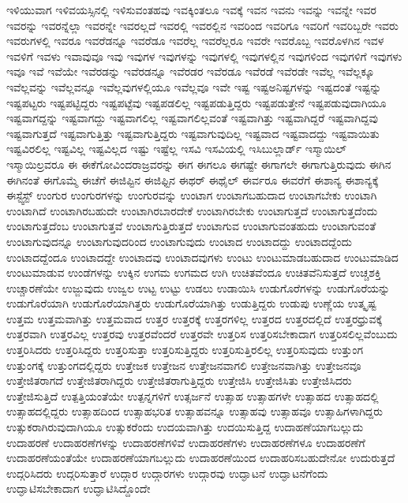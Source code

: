 {ಇಳಿಯುವಾಗ
ಇಳಿವಯಸ್ಸಿನಲ್ಲಿ
ಇಳಿಸುವಂತಹವು
ಇವಕ್ಕಿಂತಲೂ
ಇವಕ್ಕೆ
ಇವನ
ಇವನು
ಇವನ್ನು
ಇವನ್ನೇ
ಇವರ
ಇವರನ್ನು
ಇವರನ್ನೆಲ್ಲಾ
ಇವರನ್ನೇ
ಇವರಲ್ಲದೆ
ಇವರಲ್ಲಿ
ಇವರಲ್ಲಿನ
ಇವರಿಂದ
ಇವರಿಗೂ
ಇವರಿಗೆ
ಇವರಿಬ್ಬರೇ
ಇವರು
ಇವರುಗಳಲ್ಲಿ
ಇವರೂ
ಇವರೆಡನ್ನೂ
ಇವರೆಡೂ
ಇವರೆಲ್ಲ
ಇವರೆಲ್ಲರೂ
ಇವರೇ
ಇವರೊಬ್ಬ
ಇವರೊಳಗಿನ
ಇವಳ
ಇವಳಿಗೆ
ಇವಳು
ಇವಾವುವೂ
ಇವು
ಇವುಗಳ
ಇವುಗಳನ್ನು
ಇವುಗಳಲ್ಲಿ
ಇವುಗಳಲ್ಲಿನ
ಇವುಗಳಿಂದ
ಇವುಗಳಿಗೆ
ಇವುಗಳು
ಇವೂ
ಇವೆ
ಇವೆಯೇ
ಇವೆರಡನ್ನು
ಇವೆರಡನ್ನೂ
ಇವೆರಡರ
ಇವೆರಡೂ
ಇವೆರಡೆ
ಇವೆರಡೇ
ಇವೆಲ್ಲ
ಇವೆಲ್ಲಕ್ಕೂ
ಇವೆಲ್ಲವನ್ನು
ಇವೆಲ್ಲವನ್ನೂ
ಇವೆಲ್ಲವುಗಳಲ್ಲಿಯೂ
ಇವೆಲ್ಲವೂ
ಇವೇ
ಇಷ್ಟ
ಇಷ್ಟಅನಿಷ್ಟಗಳನ್ನು
ಇಷ್ಟದಂತೆ
ಇಷ್ಟನ್ನು
ಇಷ್ಟಪಟ್ಟರು
ಇಷ್ಟಪಟ್ಟಿದ್ದರು
ಇಷ್ಟಪಟ್ಟೆವು
ಇಷ್ಟಪಡಲಿಲ್ಲ
ಇಷ್ಟಪಡುತ್ತಿದ್ದರು
ಇಷ್ಟಪಡುತ್ತೇನೆ
ಇಷ್ಟಪಡುವುದಾಗಿಯೂ
ಇಷ್ಟವಾಗದ್ದನ್ನು
ಇಷ್ಟವಾಗದ್ದು
ಇಷ್ಟವಾಗಲಿಲ್ಲ
ಇಷ್ಟವಾಗಲಿಲ್ಲವಂತೆ
ಇಷ್ಟವಾಗಿತ್ತು
ಇಷ್ಟವಾಗಿದ್ದರೆ
ಇಷ್ಟವಾಗಿದ್ದವು
ಇಷ್ಟವಾಗುತ್ತದೆ
ಇಷ್ಟವಾಗುತ್ತಿತ್ತು
ಇಷ್ಟವಾಗುತ್ತಿದ್ದರು
ಇಷ್ಟವಾಗುವುದಿಲ್ಲ
ಇಷ್ಟವಾದ
ಇಷ್ಟವಾದದ್ದು
ಇಷ್ಟವಾಯಿತು
ಇಷ್ಟವಿರಲಿಲ್ಲ
ಇಷ್ಟವಿಲ್ಲ
ಇಷ್ಟವಿಲ್ಲದ
ಇಷ್ಟು
ಇಷ್ಟೆಲ್ಲ
ಇಸವಿ
ಇಸವಿಯಲ್ಲಿ
ಇಸಿಬುಲ್ಲಾರ್ಡ್
ಇಸ್ಮಾಯಿಲ್
ಇಸ್ಮಾಯಿಲ್ರವರೂ
ಈ
ಈಕೆಗೋವಿಂದರಾಜ್ರವರನ್ನು
ಈಗ
ಈಗಲೂ
ಈಗಷ್ಟೇ
ಈಗಾಗಲೇ
ಈಗಾಗುತ್ತಿರುವುದು
ಈಗಿನ
ಈಗಿನಂತೆ
ಈಗೊಮ್ಮೆ
ಈಚೆಗೆ
ಈಜಿಪ್ಟಿನ
ಈಜಿಫ್ಟಿನ
ಈಥರ್
ಈಥೈಲ್
ಈರ್ವರೂ
ಈವರೆಗೆ
ಈಶಾನ್ಯ
ಈಶಾನ್ಯಕ್ಕೆ
ಈಸ್ಟ್ವೆಸ್ಟ್
ಉಂಗುರ
ಉಂಗುರಗಳನ್ನು
ಉಂಗುರವನ್ನು
ಉಂಟಾಗ
ಉಂಟಾಗಬಹುದಾದ
ಉಂಟಾಗಬೇಕು
ಉಂಟಾಗಿ
ಉಂಟಾಗಿದೆ
ಉಂಟಾಗಿರಬಹುದೇ
ಉಂಟಾಗಿರಬಾರದೇಕೆ
ಉಂಟಾಗಿರಬೇಕು
ಉಂಟಾಗುತ್ತದೆ
ಉಂಟಾಗುತ್ತದೆಂದು
ಉಂಟಾಗುತ್ತದೆಂಬ
ಉಂಟಾಗುತ್ತವೆ
ಉಂಟಾಗುತ್ತಿರುತ್ತದೆ
ಉಂಟಾಗುವ
ಉಂಟಾಗುವಂತಹುದು
ಉಂಟಾಗುವಂತೆ
ಉಂಟಾಗುವುದನ್ನೂ
ಉಂಟಾಗುವುದರಿಂದ
ಉಂಟಾಗುವುದು
ಉಂಟಾದ
ಉಂಟಾದದ್ದು
ಉಂಟಾದದ್ದೆಂದು
ಉಂಟಾದದ್ದೆಂದೂ
ಉಂಟಾದದ್ದೇ
ಉಂಟಾದವು
ಉಂಟಾದವುಗಳು
ಉಂಟು
ಉಂಟುಮಾಡಬಹುದಾದ
ಉಂಟುಮಾಡಿದ
ಉಂಟುಮಾಡುವ
ಉಂಡೆಗಳನ್ನು
ಉಕ್ಕಿನ
ಉಗಮ
ಉಗಮದ
ಉಗಿ
ಉಚಿತವೆಂದೂ
ಉಚಿತವೆನಿಸುತ್ತದೆ
ಉಚ್ಚಶಕ್ತಿ
ಉಚ್ಚಾರಣೆಯೇ
ಉಜ್ಜುವುದು
ಉಜ್ವಲ
ಉಟ್ಟ
ಉಟ್ಟು
ಉಡಲು
ಉಡಾಯಿಸಿ
ಉಡುಗೊರೆಗಳನ್ನು
ಉಡುಗೊರೆಯನ್ನು
ಉಡುಗೊರೆಯಾಗಿ
ಉಡುಗೊರೆಯಾಗಿತ್ತರು
ಉಡುಗೊರೆಯಾಗಿತ್ತು
ಉಡುತ್ತಿದ್ದರು
ಉಡುಪು
ಉಣ್ಣೆಯ
ಉತ್ಕೃಷ್ಟ
ಉತ್ತಮ
ಉತ್ತಮವಾಗಿತ್ತು
ಉತ್ತಮವಾದ
ಉತ್ತರ
ಉತ್ತರಕ್ಕೆ
ಉತ್ತರಗಳಿಲ್ಲ
ಉತ್ತರದ
ಉತ್ತರದಲ್ಲಿದೆ
ಉತ್ತರಧ್ರುವಕ್ಕೆ
ಉತ್ತರವಾಗಿ
ಉತ್ತರವಿಲ್ಲ
ಉತ್ತರವು
ಉತ್ತರವೆಂದರೆ
ಉತ್ತರವೇ
ಉತ್ತರಿಸ
ಉತ್ತರಿಸಬೇಕಾದಾಗ
ಉತ್ತರಿಸಲಿಲ್ಲವೆಂಬುದು
ಉತ್ತರಿಸಿದರು
ಉತ್ತರಿಸಿದ್ದರು
ಉತ್ತರಿಸುತ್ತಾ
ಉತ್ತರಿಸುತ್ತಿದ್ದರು
ಉತ್ತರಿಸುತ್ತಿರಲಿಲ್ಲ
ಉತ್ತರಿಸುವುದು
ಉತ್ತುಂಗ
ಉತ್ತುಂಗಕ್ಕೆ
ಉತ್ತುಂಗದಲ್ಲಿದ್ದರು
ಉತ್ತೇಜಕ
ಉತ್ತೇಜನ
ಉತ್ತೇಜನವಾಗಲಿ
ಉತ್ತೇಜನವಾಗಿತ್ತು
ಉತ್ತೇಜನವೂ
ಉತ್ತೇಜಿತರಾಗದೆ
ಉತ್ತೇಜಿತರಾಗಿದ್ದರು
ಉತ್ತೇಜಿತರಾಗುತ್ತಿದ್ದರು
ಉತ್ತೇಜಿಸಿ
ಉತ್ತೇಜಿಸಿತು
ಉತ್ತೇಜಿಸಿದರು
ಉತ್ತೇಜಿಸುತ್ತಿದೆ
ಉತ್ಪತ್ತಿಯಂತೆಯೇ
ಉತ್ಪನ್ನಗಳಿಗೆ
ಉತ್ಸರ್ಜನೆ
ಉತ್ಸಾಹ
ಉತ್ಸಾಹಗಳೇ
ಉತ್ಸಾಹದ
ಉತ್ಸಾಹದಲ್ಲಿ
ಉತ್ಸಾಹದಲ್ಲಿದ್ದರು
ಉತ್ಸಾಹದಿಂದ
ಉತ್ಸಾಹಭರಿತ
ಉತ್ಸಾಹವನ್ನೂ
ಉತ್ಸಾಹವು
ಉತ್ಸಾಹವೂ
ಉತ್ಸಾಹಿಗಳಾಗಿದ್ದರು
ಉತ್ಸುಕರಾಗಿರುವುದಾಗಿಯೂ
ಉತ್ಸುಕರೆಂದು
ಉದಯವಾಗಿತ್ತು
ಉದಯಿಸುತ್ತಿದ್ದ
ಉದಾಹಣೆಯಾಗಬಲ್ಲುದು
ಉದಾಹರಣೆ
ಉದಾಹರಣೆಗಳನ್ನು
ಉದಾಹರಣೆಗಳಿವೆ
ಉದಾಹರಣೆಗಳು
ಉದಾಹರಣೆಗಳೂ
ಉದಾಹರಣೆಗೆ
ಉದಾಹರಣೆಯಂತೆಯೇ
ಉದಾಹರಣೆಯಾಗಬಲ್ಲುದು
ಉದಾಹರಣೆಯಿಂದ
ಉದಾಹರಿಸಬಹುದೇನೋ
ಉದುರುತ್ತದೆ
ಉದ್ಗರಿಸಿದರು
ಉದ್ಗರಿಸುತ್ತಾರೆ
ಉದ್ಗಾರ
ಉದ್ಗಾರಗಳು
ಉದ್ಗಾರವು
ಉದ್ಘಾಟನೆ
ಉದ್ಘಾಟನೆಗೆಂದು
ಉದ್ಘಾಟಿಸಬೇಕಾದಾಗ
ಉದ್ಘಾಟಿಸಿದ್ದೊಂದೇ
}
